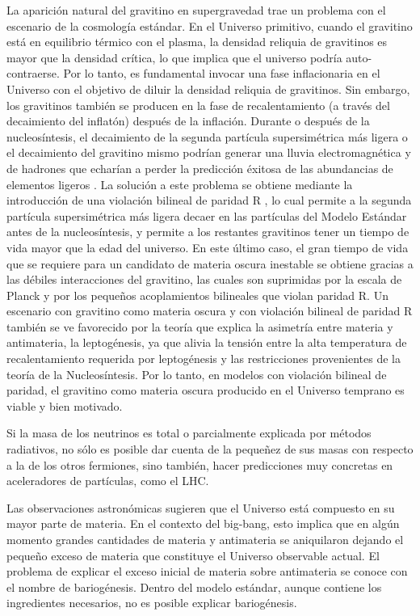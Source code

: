 La aparición natural del gravitino en supergravedad trae un problema con el escenario de la cosmología estándar. En el Universo primitivo, cuando el gravitino está en equilibrio térmico con el plasma, la densidad reliquia de gravitinos es mayor que la densidad crítica, lo que implica que el universo podría auto-contraerse. Por lo tanto, es fundamental invocar una fase inflacionaria en el Universo con el objetivo de diluir la densidad reliquia de gravitinos. Sin embargo, los gravitinos también se producen en la fase de recalentamiento (a través del decaimiento del inflatón) después de la inflación. Durante o después de la nucleosíntesis, el decaimiento de la segunda partícula supersimétrica más ligera o el decaimiento del gravitino mismo podrían generar una lluvia electromagnética y de hadrones que echarían a perder la predicción éxitosa de las abundancias de elementos ligeros \cite{Sarkar:1995dd}. La solución a este problema se obtiene mediante la introducción de una violación bilineal de paridad R \cite{Buchmuller:2007ui}, lo cual permite a la segunda partícula supersimétrica más ligera decaer en las partículas del Modelo Estándar antes de la nucleosíntesis, y permite a los restantes gravitinos tener un tiempo de vida mayor que la edad del universo. En este último caso, el gran tiempo de vida que se requiere para un candidato de materia oscura inestable se obtiene gracias a las débiles interacciones del gravitino, las cuales  son suprimidas por la escala de Planck y por los pequeños acoplamientos bilineales que violan paridad R. Un escenario con gravitino como materia oscura y con violación bilineal de paridad R también se ve favorecido por la teoría que explica la asimetría entre materia y antimateria, la leptogénesis, ya que alivia la tensión entre la alta temperatura de recalentamiento requerida por leptogénesis y las restricciones provenientes de la teoría de la Nucleosíntesis. Por lo tanto, en modelos con violación bilineal de paridad, el gravitino como materia oscura producido en el Universo temprano es viable y bien motivado. 

Si la masa de los neutrinos es total o parcialmente explicada por
métodos radiativos, no sólo es posible dar cuenta de la pequeñez de
sus masas con respecto a la de los otros fermiones, sino también,
hacer predicciones muy concretas en aceleradores de partículas, como
el LHC. 


Las observaciones astronómicas sugieren que el Universo está compuesto
en su mayor parte de materia. En el contexto del big-bang, esto
implica que en algún momento grandes cantidades de materia y
antimateria se aniquilaron dejando el pequeño exceso de materia que
constituye el Universo observable actual. El problema de explicar el
exceso inicial de materia sobre antimateria se conoce con el nombre de
bariogénesis. Dentro del modelo estándar, aunque contiene los
ingredientes necesarios, no es posible explicar bariogénesis.

